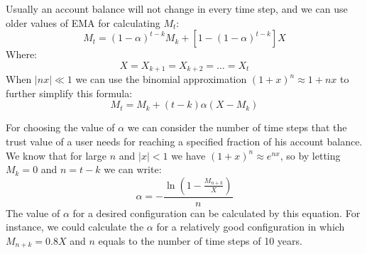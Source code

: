 \documentclass[11pt]{article}
\begin{document}
    Usually an account balance will not change in every time step, and we can use older values of EMA for calculating
    \(M_t\):
    \[
        M_t = (1 - \alpha)^{t-k}M_k + [1 - (1 - \alpha)^{t - k}]X
    \]
    Where:
    \[
        X = X_{k+1} = X_{k+2} = \dots = X_t
    \]
    When \(|nx| \ll 1\) we can use the binomial approximation  \((1 + x)^n \approx 1 + nx\) to further simplify this
    formula:
    \[
        M_t = M_k + (t - k) \alpha (X - M_k)
    \]

    For choosing the value of \(\alpha\) we can consider the number of time steps that the trust value of a user needs
    for reaching a specified fraction of his account balance.
    We know that for large \(n\) and \(|x| < 1\) we have \((1 + x)^n \approx e^{nx}\), so by letting \(M_k = 0\) and
    \(n = t - k\)
    we can write:
    \[
        \alpha =- \frac{\ln\left(1 - \frac{M_{n+k}}{X}\right)}{n}
    \]
    The value of \(\alpha\) for a desired configuration can be calculated by this equation.
    For instance, we could calculate the \(\alpha\) for a relatively good configuration in which \(M_{n+k} = 0.8X\)
    and \(n\) equals to the number of time steps of 10 years.
\end{document}
